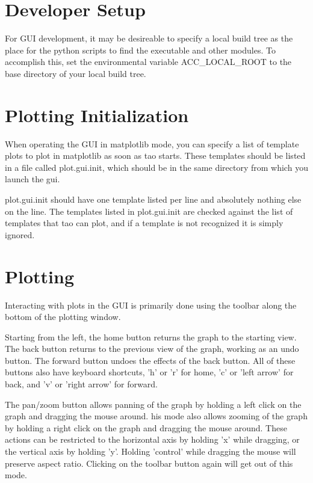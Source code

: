 \section{Developer Setup}
\label{s:gui.develop}

For GUI development, it may be desireable to specify a local build tree as the place for the python
scripts to find the \tao executable and other modules. To accomplish this, set the environmental
variable ACC_LOCAL_ROOT to the base directory of your local build tree.

\section{Plotting Initialization}
\label{s:gui.plot.init}

When operating the GUI in matplotlib mode, you can specify a list of template plots to plot in matplotlib as soon as tao starts.  These templates should be listed in a file called plot.gui.init, which should be in the same directory from which you launch the gui.

plot.gui.init should have one template listed per line and absolutely nothing else on the line.  The templates listed in plot.gui.init are checked against the list of templates that tao can plot, and if a template is not recognized it is simply ignored.


\section{Plotting}
\label{s:gui.plot}

Interacting with plots in the GUI is primarily done using the toolbar along the bottom of the plotting window.

Starting from the left, the home button returns the graph to the starting view. The back button returns to the previous view of the graph, working as an undo button. The forward button undoes the effects of the back button. All of these buttons also have keyboard shortcuts, 'h' or 'r' for home, 'c' or 'left arrow' for back, and 'v' or 'right arrow' for forward.

The pan/zoom button allows panning of the graph by holding a left click on the graph and dragging the mouse around. his mode also allows zooming of the graph by holding a right click on the graph and dragging the mouse around. These actions can be restricted to the horizontal axis by holding 'x' while dragging, or the vertical axis by holding 'y'. Holding 'control' while dragging the mouse will preserve aspect ratio. Clicking on the toolbar button again will get out of this mode.

